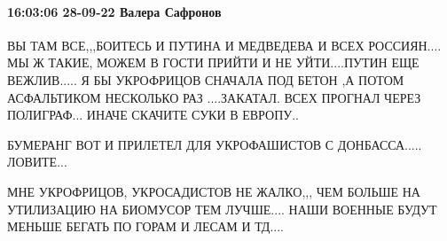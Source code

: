 \paragraph{16:03:06 28-09-22 Валера Сафронов}

ВЫ ТАМ ВСЕ,,,БОИТЕСЬ И ПУТИНА И МЕДВЕДЕВА И ВСЕХ РОССИЯН.... МЫ Ж ТАКИЕ, МОЖЕМ
В ГОСТИ ПРИЙТИ И НЕ УЙТИ....ПУТИН ЕЩЕ ВЕЖЛИВ..... Я БЫ УКРОФРИЦОВ СНАЧАЛА ПОД
БЕТОН ,А ПОТОМ АСФАЛЬТИКОМ НЕСКОЛЬКО РАЗ ....ЗАКАТАЛ. ВСЕХ ПРОГНАЛ ЧЕРЕЗ
ПОЛИГРАФ... ИНАЧЕ СКАЧИТЕ СУКИ В ЕВРОПУ..

БУМЕРАНГ ВОТ И ПРИЛЕТЕЛ ДЛЯ УКРОФАШИСТОВ С ДОНБАССА..... ЛОВИТЕ...

МНЕ УКРОФРИЦОВ, УКРОСАДИСТОВ НЕ ЖАЛКО,,, ЧЕМ БОЛЬШЕ НА УТИЛИЗАЦИЮ НА БИОМУСОР
ТЕМ ЛУЧШЕ.... НАШИ ВОЕННЫЕ БУДУТ МЕНЬШЕ БЕГАТЬ ПО ГОРАМ И ЛЕСАМ И ТД....

